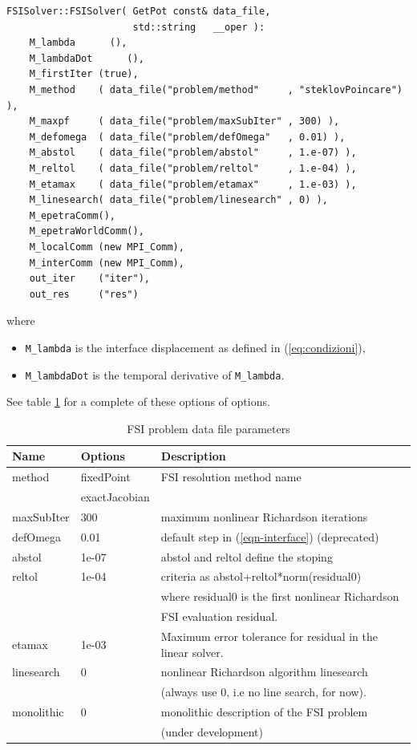 \begin{verbatim}
FSISolver::FSISolver( GetPot const& data_file,
                      std::string   __oper ):
    M_lambda      (),
    M_lambdaDot      (),
    M_firstIter (true),
    M_method    ( data_file("problem/method"     , "steklovPoincare") ),
    M_maxpf     ( data_file("problem/maxSubIter" , 300) ),
    M_defomega  ( data_file("problem/defOmega"   , 0.01) ),
    M_abstol    ( data_file("problem/abstol"     , 1.e-07) ),
    M_reltol    ( data_file("problem/reltol"     , 1.e-04) ),
    M_etamax    ( data_file("problem/etamax"     , 1.e-03) ),
    M_linesearch( data_file("problem/linesearch" , 0) ),
    M_epetraComm(),
    M_epetraWorldComm(),
    M_localComm (new MPI_Comm),
    M_interComm (new MPI_Comm),
    out_iter    ("iter"),
    out_res     ("res")
\end{verbatim}


where
\begin{itemize}
\item \verb!M_lambda! is the interface displacement as defined in (\ref{eq:condizioni}),
\item \verb!M_lambdaDot! is the temporal derivative of \verb!M_lambda!.
\end{itemize}
See table \ref{table-fsiparams} for a complete of these options of options.

\begin{table}[!h]
\begin{center}
\begin{tabular}{|l|l|l|}
\hline
Name & Options & Description \\
\hline \hline
method & fixedPoint & FSI resolution method name\\
& exactJacobian & \\
\hline
maxSubIter & 300 & maximum nonlinear Richardson iterations \\
\hline
defOmega & 0.01 & default step in (\ref{eqn-interface}) (deprecated) \\
\hline
abstol & 1e-07 & abstol and reltol define the stoping \\
reltol & 1e-04 & criteria as abstol+reltol*norm(residual0) \\
& & where residual0 is the first nonlinear Richardson \\
& & FSI evaluation residual. \\
\hline
etamax & 1e-03 &  Maximum error tolerance for residual in the linear solver. \\
\hline
linesearch & 0 & nonlinear Richardson algorithm linesearch \\
& & (always use 0, i.e no line search, for now).\\
monolithic & 0 & monolithic description of the FSI problem \\
& & (under development)\\
\hline

\end{tabular}
\end{center}
\caption{ FSI problem data file parameters
}
\label{table-fsiparams}
\end{table}


